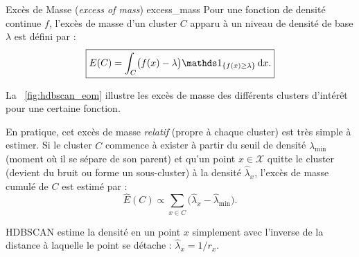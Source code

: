 \begin{Definition}{Excès de Masse (\emph{excess of mass}) \cite{HDBSCAN}}{excess_mass}
Pour une fonction de densité continue $f$, l'excès de masse d'un cluster $C$ apparu à un niveau de densité de base $\lambda$ est défini par :
\[
\boxed{
    E(C) = \int_C \bigl(f(x) - \lambda\bigr) \ind{f(x) \ge \lambda} \, \mathrm{d}x.
    }
\]
\end{Definition}

La \Fig~\ref{fig:hdbscan_eom} illustre les excès de masse des différents clusters d'intérêt pour une certaine fonction.

En pratique, cet excès de masse \emph{relatif} (propre à chaque cluster) est très simple à estimer. %
Si le cluster $C$ commence à exister à partir du seuil de densité $\hat{\lambda}_{\min}$ (moment où il se sépare de son parent) et qu'un point $x \in \mathcal X$ quitte le cluster (devient du bruit ou forme un sous-cluster) à la densité $\hat{\lambda}_x$, l'excès de masse cumulé de $C$ est estimé par :
\[
    \widehat{E}(C) \propto \sum_{x \in C} \bigl(\hat{\lambda}_x - \hat{\lambda}_{\min}\bigr).
\]

HDBSCAN estime la densité en un point $x$ simplement avec l'inverse de la distance à laquelle le point se détache : $\hat{\lambda}_x = 1/r_x$.



